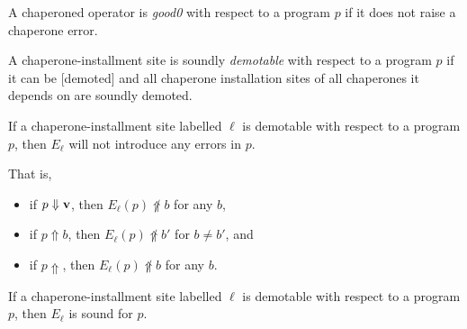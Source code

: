 
\begin{definition}
A chaperoned operator is \emph{good0} with respect to a program $p$ if it does not raise a chaperone error.
\end{definition}

\begin{definition}
A chaperone-installment site is soundly \emph{demotable} with respect to a program $p$ if it can be [demoted] and all chaperone installation sites of all chaperones it depends on are soundly demoted.
\end{definition}

\begin{lemma}
If a chaperone-installment site labelled $\ell$ is demotable with respect to a program $p$, then $E_\ell$ will not introduce any errors in $p$.

That is,
\begin{itemize}
\item if $p\Downarrow\mathbf{v}$, then $E_\ell(p)\not\Uparrow b$ for any $b$,
\item if $p\Uparrow b$, then $E_\ell(p)\not\Uparrow b'$ for $b\ne b'$, and
\item if $p\Uparrow$, then $E_\ell(p)\not\Uparrow b$ for any $b$.
\end{itemize}
\end{lemma}



\begin{theorem}
If a chaperone-installment site labelled $\ell$ is demotable with respect to a program $p$, then $E_\ell$ is sound for $p$.
\end{theorem}



